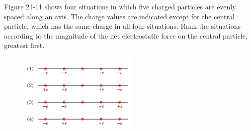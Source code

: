 \documentclass[11pt]{exam}
\begin{document}
\begin{questions}
\addpoints
\question[10] Figure 21-11 shows four situations in which five charged particles are evenly spaced along an axis. The charge values are indicated except for the central particle, which has the same charge in all four situations. Rank the situations according to the magnitude of the net electrostatic force on the central particle, greatest first.\begin{figure}[H]
\centering
\includegraphics[scale=0.8]{assets/Halliday_ch21q1.png}
\end{figure}
\newpage





\end{questions}
\end{document}
